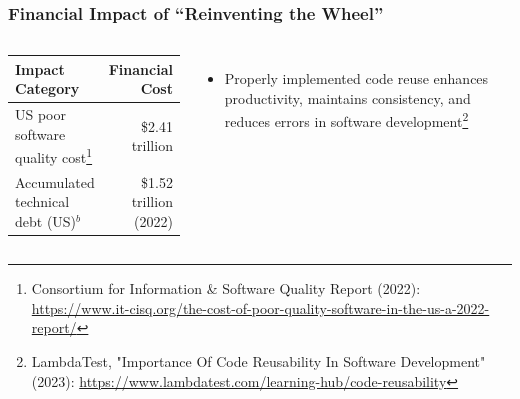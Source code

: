\documentclass{beamer}
\begin{document}
\begin{frame}
\frametitle{Financial Impact of ``Reinventing the Wheel''}

\begin{columns}[T]


\begin{center}
\begin{tabular}{lr}
\toprule
\textbf{Impact Category} & \textbf{Financial Cost} \\
\midrule

US poor software quality cost\footnote{\label{foot2}\tiny Consortium for Information \& Software Quality Report (2022): \url{https://www.it-cisq.org/the-cost-of-poor-quality-software-in-the-us-a-2022-report/}} & \$2.41 trillion \\
Accumulated technical debt (US)$^b$ & \$1.52 trillion (2022) \\
\bottomrule
\end{tabular}
\end{center}

\vspace{0.5cm}
\begin{itemize}
\item Properly implemented code reuse enhances productivity, maintains consistency, and reduces errors in software development\footnote{\tiny LambdaTest, "Importance Of Code Reusability In Software Development" (2023): \url{https://www.lambdatest.com/learning-hub/code-reusability}}
\end{itemize}
\vspace{0.5cm}



\end{columns}
\end{frame}
\end{document}
